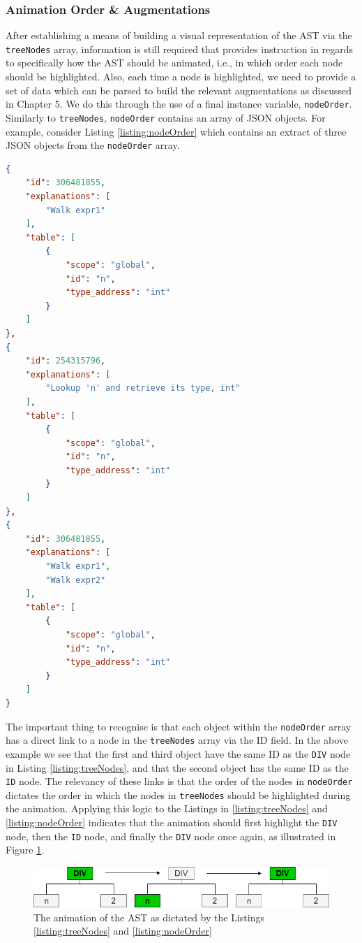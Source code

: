 \documentclass{l4proj}
\begin{document}
\subsubsection{Animation Order \& Augmentations}
After establishing a means of building a visual representation of the AST via the \texttt{treeNodes} array, information is still required that provides instruction in regards to specifically how the AST should be animated, i.e., in which order each node should be highlighted. Also, each time a node is highlighted, we need to provide a set of data which can be parsed to build the relevant augmentations as discussed in Chapter 5. We do this through the use of a final instance variable, \texttt{nodeOrder}. Similarly to \texttt{treeNodes}, \texttt{nodeOrder} contains an array of JSON objects. For example, consider Listing \ref{listing:nodeOrder} which contains an extract of three JSON objects from the \texttt{nodeOrder} array.
\begin{lstlisting}[language=json,caption=Extract from a \texttt{nodeOrder} array,label=listing:nodeOrder]
{
	"id": 306481855,
	"explanations": [
		"Walk expr1"
	],
	"table": [
		{
			"scope": "global",
			"id": "n",
			"type_address": "int"
		}
	]
},
{
	"id": 254315796,
	"explanations": [
		"Lookup 'n' and retrieve its type, int"
	],
	"table": [
		{
			"scope": "global",
			"id": "n",
			"type_address": "int"
		}
	]
},
{
	"id": 306481855,
	"explanations": [
		"Walk expr1",
		"Walk expr2"
	],
	"table": [
		{
			"scope": "global",
			"id": "n",
			"type_address": "int"
		}
	]
}
\end{lstlisting}

The important thing to recognise is that each object within the \texttt{nodeOrder} array has a direct link to a node in the \texttt{treeNodes} array via the ID field. In the above example we see that the first and third object have the same ID as the \texttt{DIV} node in Listing \ref{listing:treeNodes}, and that the second object has the same ID as the \texttt{ID} node. The relevancy of these links is that the order of the nodes in \texttt{nodeOrder} dictates the order in which the nodes in \texttt{treeNodes} should be highlighted during the animation. Applying this logic to the Listings in \ref{listing:treeNodes} and \ref{listing:nodeOrder} indicates that the animation should first highlight the \texttt{DIV} node, then the \texttt{ID} node, and finally the \texttt{DIV} node once again, as illustrated in Figure \ref{fig:animOrder}.
\begin{figure}[h]
\centering
\includegraphics[scale=0.5]{images/animOrder.png}
\caption{The animation of the AST as dictated by the Listings \ref{listing:treeNodes} and \ref{listing:nodeOrder}}
\label{fig:animOrder}	
\end{figure}
\end{document}
